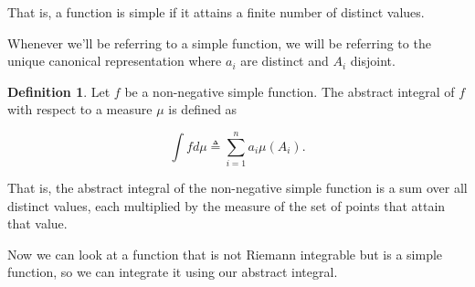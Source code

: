\documentclass{book}
\theoremstyle{plain}%
\theoremstyle{definition}
\newtheorem{definition}{Definition}[section]
\begin{document}
That is, a function is simple if it attains a finite number of distinct values.

Whenever we'll be referring to a simple function, we will be referring to the unique canonical representation where $a_i$ are distinct and $A_i$ disjoint.

\begin{definition}
Let $f$ be a non-negative simple function. The abstract integral of $f$ with respect to a measure $\mu$ is defined as

$$\int f d\mu \triangleq \sum_{i=1}^n a_i\mu(A_i).$$
\end{definition}

That is, the abstract integral of the non-negative simple function is a sum over all distinct values, each multiplied by the measure of the set of points that attain that value.

Now we can look at a function that is not Riemann integrable but is a simple function, so we can integrate it using our abstract integral.
\end{document}
